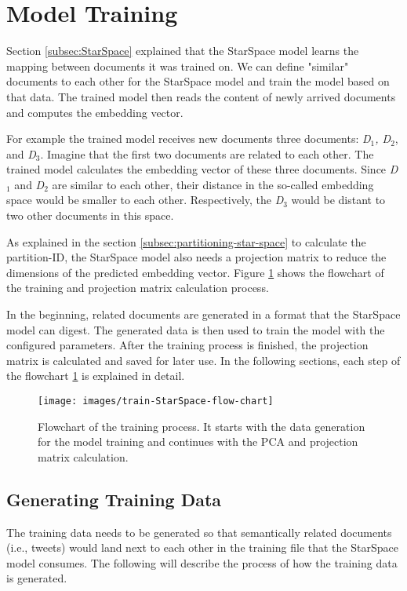 \section{Model Training}
\label{sec:model-training}
Section \ref{subsec:StarSpace} explained that the StarSpace model learns the mapping between documents it was trained on. We can define "similar" documents to each other for the StarSpace model and train the model based on that data. The trained model then reads the content of newly arrived documents and computes the embedding vector. 


For example the trained model receives new documents three documents: \emph{D$_1$, D$_2$}, and \emph{D$_3$}. Imagine that the first two documents are related to each other. The trained model calculates the embedding vector of these three documents. Since \emph{D$_1$} and \emph{D$_2$} are similar to each other, their distance in the so-called embedding space would be smaller to each other. Respectively, the \emph{D$_3$} would be distant to two other documents in this space.


As explained in the section \ref{subsec:partitioning-star-space} to calculate the partition-ID, the StarSpace model also needs a projection matrix to reduce the dimensions of the predicted embedding vector. Figure \ref{fig:star-space-training} shows the flowchart of the training and projection matrix calculation process.


In the beginning, related documents are generated in a format that the StarSpace model can digest. The generated data is then used to train the model with the configured parameters. After the training process is finished, the projection matrix is calculated and saved for later use. In the following sections, each step of the flowchart \ref{fig:star-space-training} is explained in detail.

\begin{figure}[!htb]
    \centering
    \texttt{[image: images/train-StarSpace-flow-chart]}
    \caption{Flowchart of the training process. It starts with the data generation for the model training and continues with the PCA and projection matrix calculation.}
    \label{fig:star-space-training}
\end{figure}

\subsection{Generating Training Data}
\label{subsec:generating-training-data}
The training data needs to be generated so that semantically related documents (i.e., tweets) would land next to each other in the training file that the StarSpace model consumes. The following will describe the process of how the training data is generated.

